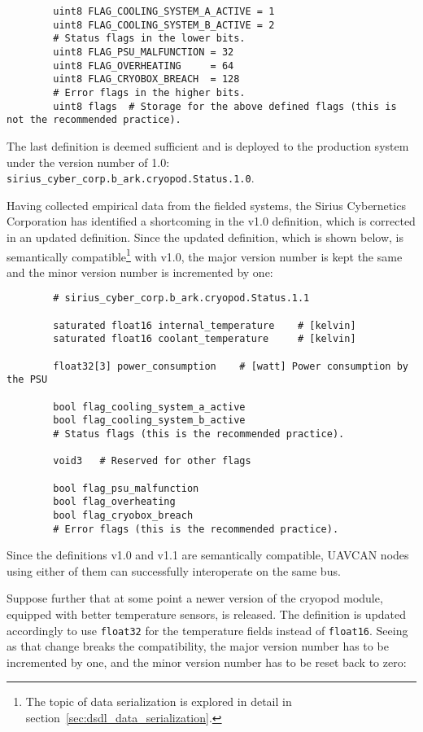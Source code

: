 \begin{remark}[breakable]
\begin{verbatim}
        uint8 FLAG_COOLING_SYSTEM_A_ACTIVE = 1
        uint8 FLAG_COOLING_SYSTEM_B_ACTIVE = 2
        # Status flags in the lower bits.
        uint8 FLAG_PSU_MALFUNCTION = 32
        uint8 FLAG_OVERHEATING     = 64
        uint8 FLAG_CRYOBOX_BREACH  = 128
        # Error flags in the higher bits.
        uint8 flags  # Storage for the above defined flags (this is not the recommended practice).
    \end{verbatim}

    The last definition is deemed sufficient and is deployed to the production system
    under the version number of 1.0: \verb|sirius_cyber_corp.b_ark.cryopod.Status.1.0|.

    Having collected empirical data from the fielded systems, the Sirius Cybernetics Corporation has
    identified a shortcoming in the v1.0 definition, which is corrected in an updated definition.
    Since the updated definition, which is shown below, is semantically compatible\footnote{%
        The topic of data serialization is explored in detail in section~\ref{sec:dsdl_data_serialization}.
    } with v1.0, the major version number is kept the same and the minor version number is incremented by one:

    \begin{verbatim}
        # sirius_cyber_corp.b_ark.cryopod.Status.1.1

        saturated float16 internal_temperature    # [kelvin]
        saturated float16 coolant_temperature     # [kelvin]

        float32[3] power_consumption    # [watt] Power consumption by the PSU

        bool flag_cooling_system_a_active
        bool flag_cooling_system_b_active
        # Status flags (this is the recommended practice).
        
        void3   # Reserved for other flags

        bool flag_psu_malfunction
        bool flag_overheating
        bool flag_cryobox_breach
        # Error flags (this is the recommended practice).
    \end{verbatim}

    Since the definitions v1.0 and v1.1 are semantically compatible,
    UAVCAN nodes using either of them can successfully interoperate on the same bus.

    Suppose further that at some point a newer version of the cryopod module,
    equipped with better temperature sensors, is released.
    The definition is updated accordingly to use \verb|float32| for the temperature fields instead of \verb|float16|.
    Seeing as that change breaks the compatibility, the major version number has to be incremented by one,
    and the minor version number has to be reset back to zero:


\end{remark}
